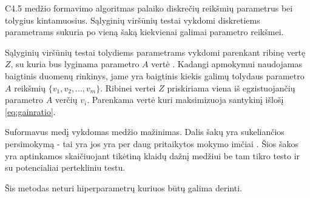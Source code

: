 C4.5 medžio formavimo algoritmas palaiko diskrečių reikšmių parametrus bei tolygius kintamuosius.
Sąlyginių viršūnių testai vykdomi diskretiems parametrams sukuria po vieną šaką kiekvienai galimai parametro reikšmei.

Sąlyginių viršūnių testai tolydiems parametrams vykdomi parenkant ribinę vertę $Z$, su kuria bus lyginama parametro
$A$ vertė \cite{c45}. Kadangi apmokymui naudojamas baigtinis duomenų rinkinys, jame yra baigtinis
kiekis galimų tolydaus parametro $A$ reikšmių $\{v_1, v_2, ..., v_m\}$. Ribinei vertei $Z$ priskiriama
viena iš egzistuojančių parametro $A$ verčių  $v_i$. Parenkama vertė kuri maksimizuoja
santykinį išlošį \ref{eq:gainratio}.

Suformavus medį vykdomas medžio mažinimas. Dalis šakų yra sukeliančios persimokymą - tai yra
jos yra per daug pritaikytos mokymo imčiai \cite{c45}. Šios šakos yra aptinkamos skaičiuojant
tikėtiną klaidų dažnį medžiui be tam tikro testo ir su potencialiai pertekliniu testu.

Šis metodas neturi hiperparametrų kuriuos būtų galima derinti.